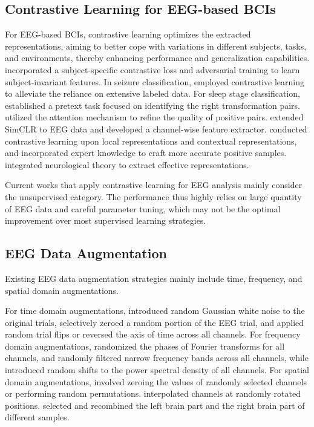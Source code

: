 \documentclass[journal]{IEEEtran}
\begin{document}
\subsection{Contrastive Learning for EEG-based BCIs}
For EEG-based BCIs, contrastive learning optimizes the extracted representations, aiming to better cope with variations in different subjects, tasks, and environments, thereby enhancing performance and generalization capabilities. \cite{cheng2020subject} incorporated a subject-specific contrastive loss and adversarial training to learn subject-invariant features. In seizure classification,  \cite{huang2023epilepsynet} employed contrastive learning to alleviate the reliance on extensive labeled data. For sleep stage classification,  \cite{jiang2021self} established a pretext task focused on identifying the right transformation pairs. \cite{lee2022self} utilized the attention mechanism to refine the quality of positive pairs. \cite{Mohsenvand2020} extended SimCLR to EEG data and developed a channel-wise feature extractor. \cite{zhang2022expert} conducted contrastive learning upon local representations and contextual representations, and incorporated expert knowledge to craft more accurate positive samples.  \cite{weng2023knowledge} integrated neurological theory to extract effective representations.

Current works that apply contrastive learning for EEG analysis mainly consider the unsupervised category. The performance thus highly relies on large quantity of EEG data and careful parameter tuning, which may not be the optimal improvement over most supervised learning strategies.

\subsection{EEG Data Augmentation} 
Existing EEG data augmentation strategies mainly include time, frequency, and spatial domain augmentations.

For time domain augmentations, \cite{Wang2018} introduced random Gaussian white noise to the original trials, \cite{Mohsenvand2020} selectively zeroed a random portion of the EEG trial, and \cite{Rommel2021} applied random trial flips or reversed the axis of time across all channels. For frequency domain augmentations, \cite{Schwabedal2018surr} randomized the phases of Fourier transforms for all channels, \cite{Mohsenvand2020} and \cite{cheng2020subject} randomly filtered narrow frequency bands across all channels, while \cite{Rommel2021} introduced random shifts to the power spectral density of all channels. For spatial domain augmentations, \cite{Saeed2021} involved zeroing the values of randomly selected channels or performing random permutations. \cite{Krell2017} interpolated channels at randomly rotated positions. \cite{pei2021hs} selected and recombined the left brain part and the right brain part of different samples.
\end{document}
